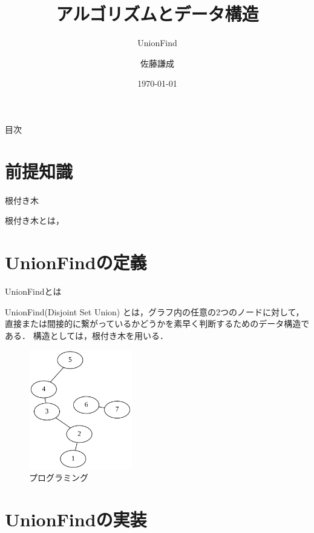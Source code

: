 

\title{アルゴリズムとデータ構造}
\subtitle{UnionFind}
\author{佐藤謙成}
\date{\today}


\maketitle

\begin{frame}[allowframebreaks]{目次}
    \tableofcontents
\end{frame}

\section{前提知識}
\begin{frame}{根付き木}
    \begin{block}{}
        根付き木とは，
    \end{block}
\end{frame}

\section{UnionFindの定義}
\begin{frame}{UnionFindとは}
    \begin{block}{}
        UnionFind(Disjoint Set Union) とは，グラフ内の任意の2つのノードに対して，直接または間接的に繋がっているかどうかを素早く判断するためのデータ構造である．
        構造としては，根付き木を用いる．
    \end{block}

    \begin{figure}[H]
        \centering
        \includegraphics[keepaspectratio, width=0.4\textwidth]{figure/01.png}
        \caption{プログラミング}
        \label{fig:01}
    \end{figure}
\end{frame}
\section{UnionFindの実装}
\begin{frame}[H]
    
\end{frame}



